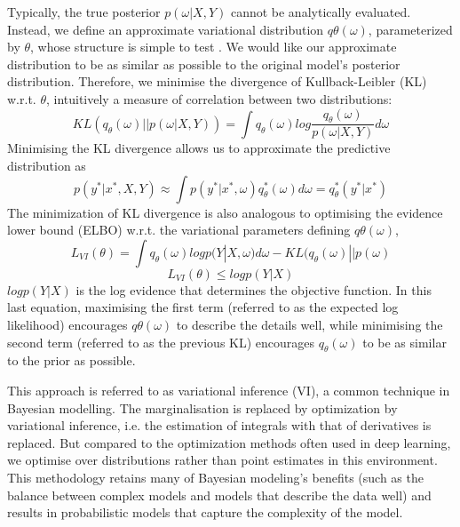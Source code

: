 \documentclass[journal]{IEEEtran}
\begin{document}
Typically, the true posterior
$p(\omega|X,Y)$ cannot be analytically evaluated.
Instead, we define an approximate variational distribution $q \theta(\omega)$,
parameterized by $\theta$, whose structure is simple to test \cite{abdar2020review}.
We would like our approximate distribution to be as
similar as possible to the original model's posterior distribution.
Therefore, we minimise the divergence of Kullback-Leibler (KL) w.r.t.
$\theta$, intuitively a measure of correlation between two distributions: 
\begin{equation*}
    KL(q_\theta(\omega) || p(\omega|X,Y)) = \int q_\theta(\omega) log\frac{q_\theta(\omega)}{p(\omega|X,Y)}d\omega
\end{equation*}
Minimising the KL divergence allows us to approximate the predictive distribution as
\begin{equation*}
    p(y^*|x^*,X,Y) \approx \int p(y^*|x^*,\omega)q_\theta^*(\omega)d\omega = q_\theta^*(y^*|x^*)
\end{equation*}
The minimization of KL divergence is also analogous to optimising the
evidence lower bound (ELBO) w.r.t. the variational parameters defining $q \theta(\omega)$, 
\begin{equation*}
        L_{VI}(\theta) = \int q_\theta(\omega)logp(Y|X,\omega)d\omega - KL(q_\theta(\omega) || p(\omega)
\end{equation*}
\begin{equation*}
     L_{VI}(\theta) \leq logp(Y|X)
\end{equation*}
$logp(Y|X)$ is the log evidence
that determines the objective function.
In this last equation, maximising the first term (referred to as the expected log likelihood) encourages $q \theta(\omega)$ to describe the details well,
while minimising the second term (referred to as the previous KL) encourages $q_\theta(\omega)$ to be as similar to the prior as possible. 

This approach is referred to as variational
inference (VI), a common technique in Bayesian modelling\cite{posch2019variational}. The marginalisation is replaced by optimization by variational inference, i.e.
the estimation of integrals with that of derivatives is replaced.
But compared to the optimization methods often used in deep learning,
we optimise over distributions rather than point estimates in this environment.
This methodology retains many of Bayesian modeling's benefits (such as the balance between complex models and models
that describe the data well) and results in probabilistic models that capture the complexity of the model\cite{posch2019variational}. 
\end{document}
